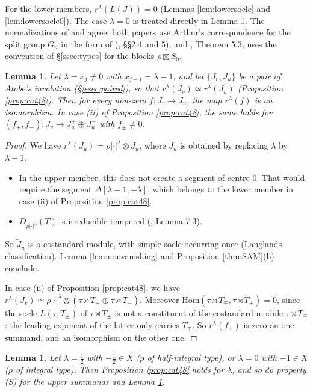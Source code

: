 \documentclass[a4paper,12pt,leqno]{amsart}
\theoremstyle{plain}
\newtheorem{lemma}[thm]{Lemma}
\theoremstyle{definition}
\begin{document}
\noindent For the lower members, $r^\lambda(L(J))=0$ (Lemmas \ref{lem:lowersocle} and
\ref{lem:lowersocle0}). The case $\lambda=0$ is treated directly in Lemma \ref{lem:smallpaired}. The
normalizations of \cite{AM23} and \cite{Ato24} agree: both papers use Arthur's correspondence for the
split group $G_n$ in the form of \cite{Ato20} (\cite{AM23}, \S\S2.4 and 5), and \cite{AM23}, Theorem 5.3, uses
the convention of \S\ref{ssec:types} for the blocks $\rho\boxtimes S_0$.

\begin{lemma}\label{lem:matchediso} Let $\lambda=x_j\neq0$ with $x_{j-1}=\lambda-1$, and let
$\{J_v,J_u\}$ be a pair of Atobe's involution (\S\ref{ssec:paired}), so that $r^\lambda(J_v)\simeq
r^\lambda(J_u)$ (Proposition \ref{prop:cat48}). Then for
every non-zero $f:J_v\to J_u$, the map $r^\lambda(f)$ is an isomorphism. In case (ii) of Proposition \ref{prop:cat48}, the same holds for $(f_+,f_-):J_v\to J_u^+\oplus J_u^-$ with
$f_\pm\neq0$.
\end{lemma}

\begin{proof}
We have $r^\lambda(J_u)=\rho|\cdot|^\lambda\otimes\widetilde J_u$, where $\widetilde J_u$ is
obtained by replacing $\lambda$ by $\lambda-1$.
\begin{itemize}
\item In the upper member, this does not create a segment of centre $0$. That would require the
segment $\Delta[\lambda-1,-\lambda]$, which belongs to the lower member in case (ii) of Proposition \ref{prop:cat48}.
\item $D_{\rho|\cdot|^\lambda}(T)$ is irreducible tempered (\cite{Xu17}, Lemma 7.3).
\end{itemize}
So $\widetilde J_u$ is a costandard module, with simple socle occurring once (Langlands
classification). Lemma \ref{lem:nonvanishing} and Proposition \ref{thm:SAM}(b) conclude.

In case (ii) of Proposition \ref{prop:cat48}, we have $r^\lambda(J_v)\simeq\rho|\cdot|^\lambda\otimes(\tau\rtimes T_+\oplus
\tau\rtimes T_-)$. Moreover $\mathrm{Hom}(\tau\rtimes T_\mp,\tau\rtimes T_\pm)=0$, since the
socle $L(\tau;T_\pm)$ of $\tau\rtimes T_\pm$ is not a constituent of the costandard module $\tau\rtimes T_\mp$:
the leading exponent of the latter only carries $T_\mp$. So $r^\lambda(f_\pm)$ is zero on one
summand, and an isomorphism on the other one.
\end{proof}

\begin{lemma}\label{lem:smallpaired} Let $\lambda=\tfrac12$ with $-\tfrac12\in X$ ($\rho$ of half-integral type), or
$\lambda=0$ with $-1\in X$ ($\rho$ of integral type). Then Proposition \ref{prop:cat48} holds for $\lambda$,
and so do property (S) for the upper summands and Lemma \ref{lem:matchediso}.
\end{lemma}
\end{document}
